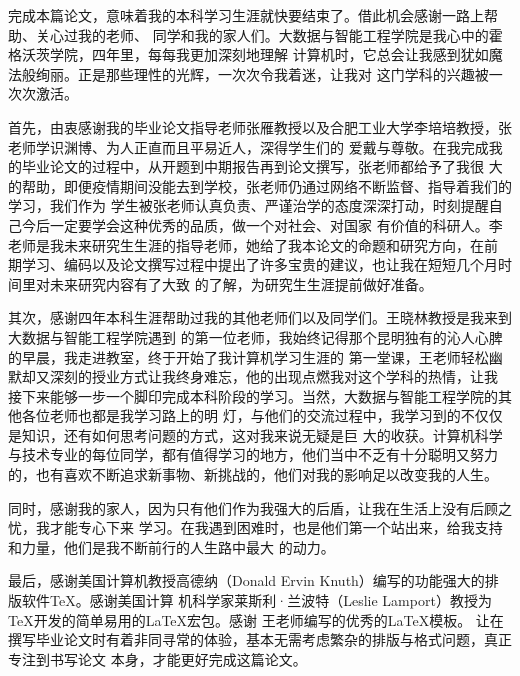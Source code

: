 \documentclass{swfuthesis}
\begin{document}
\appendix %
\makebib %

\begin{advisorInfo} %
  
\end{advisorInfo}

\begin{acknowledgment} %
完成本篇论文，意味着我的本科学习生涯就快要结束了。借此机会感谢一路上帮助、关心过我的老师、
同学和我的家人们。大数据与智能工程学院是我心中的霍格沃茨学院，四年里，每每我更加深刻地理解
计算机时，它总会让我感到犹如魔法般绚丽。正是那些理性的光辉，一次次令我着迷，让我对
这门学科的兴趣被一次次激活。

首先，由衷感谢我的毕业论文指导老师张雁教授以及合肥工业大学李培培教授，张老师学识渊博、为人正直而且平易近人，深得学生们的
爱戴与尊敬。在我完成我的毕业论文的过程中，从开题到中期报告再到论文撰写，张老师都给予了我很
大的帮助，即便疫情期间没能去到学校，张老师仍通过网络不断监督、指导着我们的学习，我们作为
学生被张老师认真负责、严谨治学的态度深深打动，时刻提醒自己今后一定要学会这种优秀的品质，做一个对社会、对国家
有价值的科研人。李老师是我未来研究生生涯的指导老师，她给了我本论文的命题和研究方向，在前
期学习、编码以及论文撰写过程中提出了许多宝贵的建议，也让我在短短几个月时间里对未来研究内容有了大致
的了解，为研究生生涯提前做好准备。

其次，感谢四年本科生涯帮助过我的其他老师们以及同学们。王晓林教授是我来到大数据与智能工程学院遇到
的第一位老师，我始终记得那个昆明独有的沁人心脾的早晨，我走进教室，终于开始了我计算机学习生涯的
第一堂课，王老师轻松幽默却又深刻的授业方式让我终身难忘，他的出现点燃我对这个学科的热情，让我
接下来能够一步一个脚印完成本科阶段的学习。当然，大数据与智能工程学院的其他各位老师也都是我学习路上的明
灯，与他们的交流过程中，我学习到的不仅仅是知识，还有如何思考问题的方式，这对我来说无疑是巨
大的收获。计算机科学与技术专业的每位同学，都有值得学习的地方，他们当中不乏有十分聪明又努力
的，也有喜欢不断追求新事物、新挑战的，他们对我的影响足以改变我的人生。

同时，感谢我的家人，因为只有他们作为我强大的后盾，让我在生活上没有后顾之忧，我才能专心下来
学习。在我遇到困难时，也是他们第一个站出来，给我支持和力量，他们是我不断前行的人生路中最大
的动力。

最后，感谢美国计算机教授高德纳（Donald Ervin Knuth）编写的功能强大的排版软件\TeX{}。感谢美国计算
机科学家莱斯利·兰波特（Leslie Lamport）教授为\TeX{}开发的简单易用的\LaTeX{}宏包。感谢
王老师编写的优秀的\LaTeX{}模板。
让在撰写毕业论文时有着非同寻常的体验，基本无需考虑繁杂的排版与格式问题，真正专注到书写论文
本身，才能更好完成这篇论文。
  
  
\end{acknowledgment}

\singlespacing
 
\end{document}

